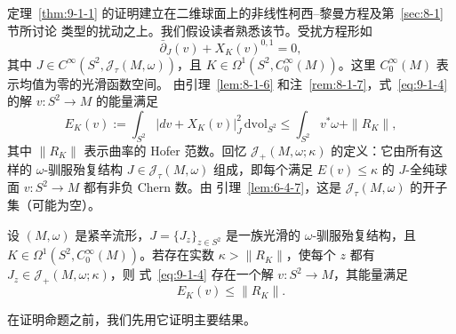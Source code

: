定理~\ref{thm:9-1-1} 的证明建立在二维球面上的非线性柯西--黎曼方程及第~\ref{sec:8-1} 节所讨论
类型的扰动之上。我们假设读者熟悉该节。受扰方程形如
\begin{equation}\label{eq:9-1-4}
  \bar\partial_J(v)+X_K(v)^{0,1}=0,
\end{equation}
其中 $J\in C^\infty(S^2,\mathcal J_\tau(M,\omega))$，且
$K\in\Omega^1(S^2,C_0^\infty(M))$。这里 $C_0^\infty(M)$ 表示均值为零的光滑函数空间。
由引理~\ref{lem:8-1-6} 和注~\ref{rem:8-1-7}，式~\eqref{eq:9-1-4} 的解
$v:S^2\to M$ 的能量满足
\begin{equation}\label{eq:9-1-5}
  E_K(v):=\int_{S^2}|dv+X_K(v)|_J^2\,\mathrm{dvol}_{S^2}
  \le \int_{S^2}v^*\omega+\|R_K\|,
\end{equation}
其中 $\|R_K\|$ 表示曲率的 Hofer 范数。回忆
$\mathcal J_+(M,\omega;\kappa)$ 的定义：它由所有这样的
$\omega$-驯服殆复结构 $J\in\mathcal J_\tau(M,\omega)$ 组成，即每个满足
$E(v)\le\kappa$ 的 $J$-全纯球面 $v:S^2\to M$ 都有非负 Chern 数。由
引理~\ref{lem:6-4-7}，这是 $\mathcal J_\tau(M,\omega)$ 的开子集（可能为空）。

\begin{proposition}\label{prop:9-1-4}
设 $(M,\omega)$ 是紧辛流形，$J=\{J_z\}_{z\in S^2}$ 是一族光滑的
$\omega$-驯服殆复结构，且 $K\in\Omega^1(S^2,C_0^\infty(M))$。若存在实数
$\kappa>\|R_K\|$，使每个 $z$ 都有 $J_z\in\mathcal J_+(M,\omega;\kappa)$，则
式~\eqref{eq:9-1-4} 存在一个解 $v:S^2\to M$，其能量满足
\[
  E_K(v)\le\|R_K\|.
\]
\end{proposition}

在证明命题之前，我们先用它证明主要结果。

